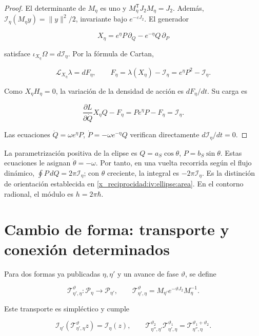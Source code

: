 \begin{proof}
El determinante de \(M_\eta\) es uno y \(M_\eta^{\mathsf T}J_2M_\eta=J_2\). Además,
\(\mathcal I_\eta(M_\eta y)=\|y\|^2/2\), invariante bajo \(e^{-\varepsilon J_2}\).
El generador

\[
X_\eta=e^\eta P\,\partial_Q-e^{-\eta}Q\,\partial_P
\]

satisface \(\iota_{X_\eta}\Omega=d\mathcal I_\eta\). Por la fórmula de Cartan,

\[
\mathcal L_{X_\eta}\lambda=dF_\eta,\qquad
F_\eta=\lambda(X_\eta)-\mathcal I_\eta=e^\eta P^2-\mathcal I_\eta.
\]

Como \(X_\eta H_\eta=0\), la variación de la densidad de acción es \(dF_\eta/dt\). Su carga es

\[
\frac{\partial L}{\partial\dot Q}X_\eta Q-F_\eta
=Pe^\eta P-F_\eta=\mathcal I_\eta.
\]

Las ecuaciones \(\dot Q=\omega e^\eta P\), \(\dot P=-\omega e^{-\eta}Q\) verifican directamente \(d\mathcal I_\eta/dt=0\).
\end{proof}

La parametrización positiva de la elipse es \(Q=a_S\cos\theta\), \(P=b_S\sin\theta\). Estas ecuaciones le asignan \(\dot\theta=-\omega\). Por tanto, en una vuelta recorrida según el flujo dinámico, \(\oint P\,dQ=2\pi\mathcal I_\eta\); con \(\theta\) creciente, la integral es \(-2\pi\mathcal I_\eta\). Es la distinción de orientación establecida en \cref{x_reciprocidad:iv:ellipse:area}. En el contorno radional, el módulo es \(h=2\pi\hbar\).

\section{Cambio de forma: transporte y conexión determinados}

Para dos formas ya publicadas \(\eta,\eta'\) y un avance de fase \(\vartheta\), se define

\begin{equation}
\mathcal T_{\eta',\eta}^{\vartheta}:\mathcal P_\eta\to\mathcal P_{\eta'},
\qquad
\mathcal T_{\eta',\eta}^{\vartheta}
=M_{\eta'}e^{-\vartheta J_2}M_\eta^{-1}.
\label{x_reciprocidad:nuc07:eq:4}
\end{equation}

\begin{proposition}
Este transporte es simpléctico y cumple

\begin{equation}
\mathcal I_{\eta'}(\mathcal T_{\eta',\eta}^{\vartheta}z)
=\mathcal I_\eta(z),\qquad
\mathcal T_{\eta'',\eta'}^{\vartheta_2}
\mathcal T_{\eta',\eta}^{\vartheta_1}
=\mathcal T_{\eta'',\eta}^{\vartheta_1+\vartheta_2}.
\label{x_reciprocidad:nuc07:eq:5}
\end{equation}
\end{proposition}

